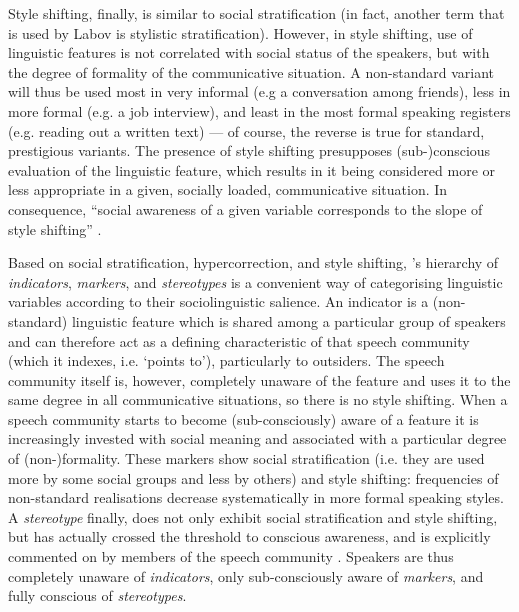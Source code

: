 Style shifting, finally, is similar to social stratification (in fact, another term that is used by Labov is stylistic stratification).
However, in style shifting, use of linguistic features is not correlated with social status of the speakers, but with the degree of formality of the communicative situation.
A non-standard variant will thus be used most in very informal (e.g a conversation among friends), less in more formal (e.g. a job interview), and least in the most formal speaking registers (e.g. reading out a written text) --- of course, the reverse is true for standard, prestigious variants.
The presence of style shifting presupposes (sub-)conscious evaluation of the linguistic feature, which results in it being considered more or less appropriate in a given, socially loaded, communicative situation.
In consequence, ``social awareness of a given variable corresponds to the slope of style shifting'' \parencite[196]{labov2001a}.

Based on social stratification, hypercorrection, and style shifting, \citeauthor{labov1972}'s \citeyear{labov1972} hierarchy of \emph{indicators}, \emph{markers}, and \emph{stereotypes} is a convenient way of categorising linguistic variables according to their sociolinguistic salience.
An indicator is a (non-standard) linguistic feature which is shared among a particular group of speakers and can therefore act as a defining characteristic of that speech community (which it indexes, i.e. `points to'), particularly to outsiders.
The speech community itself is, however, completely unaware of the feature and uses it to the same degree in all communicative situations, so there is no style shifting.
When a speech community starts to become (sub-consciously) aware of a feature it is increasingly invested with social meaning and associated with a particular degree of (non-)formality.
These markers show social stratification (i.e. they are used more by some social groups and less by others) and style shifting: frequencies of non-standard realisations decrease systematically in more formal speaking styles.
A \emph{stereotype} finally, does not only exhibit social stratification and style shifting, but has actually crossed the threshold to conscious awareness, and is explicitly commented on by members of the speech community \parencite[cf.][178--180]{labov1972}.
Speakers are thus completely unaware of \emph{indicators}, only sub-consciously aware of \emph{markers}, and fully conscious of \emph{stereotypes}.

